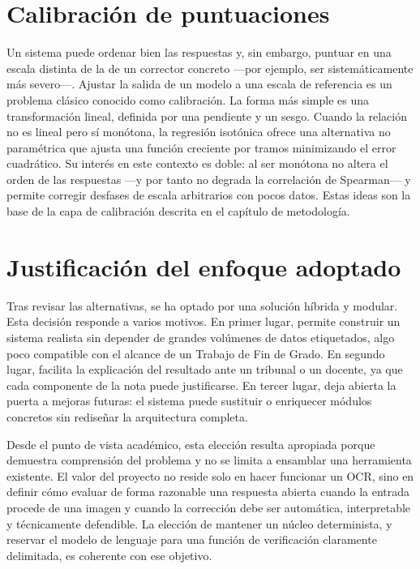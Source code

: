 \section{Calibración de puntuaciones}

Un sistema puede ordenar bien las respuestas y, sin embargo, puntuar en una escala distinta de la de un corrector concreto —por ejemplo, ser sistemáticamente más severo—. Ajustar la salida de un modelo a una escala de referencia es un problema clásico conocido como calibración. La forma más simple es una transformación lineal, definida por una pendiente y un sesgo. Cuando la relación no es lineal pero sí monótona, la regresión isotónica \parencite{barlow1972} ofrece una alternativa no paramétrica que ajusta una función creciente por tramos minimizando el error cuadrático. Su interés en este contexto es doble: al ser monótona no altera el orden de las respuestas —y por tanto no degrada la correlación de Spearman— y permite corregir desfases de escala arbitrarios con pocos datos. Estas ideas son la base de la capa de calibración descrita en el capítulo de metodología.

\section{Justificación del enfoque adoptado}

Tras revisar las alternativas, se ha optado por una solución híbrida y modular. Esta decisión responde a varios motivos. En primer lugar, permite construir un sistema realista sin depender de grandes volúmenes de datos etiquetados, algo poco compatible con el alcance de un Trabajo de Fin de Grado. En segundo lugar, facilita la explicación del resultado ante un tribunal o un docente, ya que cada componente de la nota puede justificarse. En tercer lugar, deja abierta la puerta a mejoras futuras: el sistema puede sustituir o enriquecer módulos concretos sin rediseñar la arquitectura completa.

Desde el punto de vista académico, esta elección resulta apropiada porque demuestra comprensión del problema y no se limita a ensamblar una herramienta existente. El valor del proyecto no reside solo en hacer funcionar un OCR, sino en definir cómo evaluar de forma razonable una respuesta abierta cuando la entrada procede de una imagen y cuando la corrección debe ser automática, interpretable y técnicamente defendible. La elección de mantener un núcleo determinista, y reservar el modelo de lenguaje para una función de verificación claramente delimitada, es coherente con ese objetivo.
